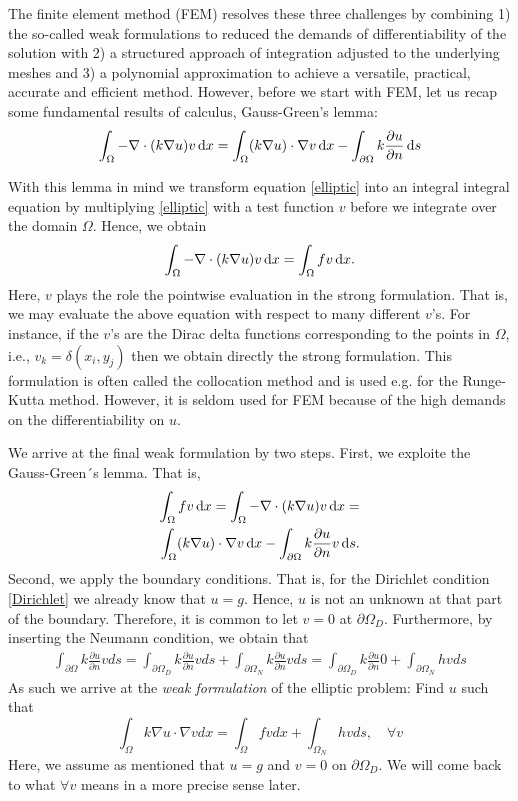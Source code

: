 The finite element method (FEM) resolves these three challenges by combining 1) the so-called weak formulations
to reduced the demands of differentiability of the solution with 2) a structured approach of integration
adjusted to the underlying meshes and 3) a polynomial approximation to achieve a versatile, practical, accurate
and efficient method. However, before we start with FEM, let us recap some fundamental results of calculus, 
Gauss-Green's lemma: 
\begin{equation}
\label{gaussgreen}
\int_\Omega 
-\nabla\cdot(k\nabla u) v \, \mathrm{d}x =  
\int_\Omega (k\nabla u) \cdot \nabla v \, \mathrm{d}x  - \int_{\partial \Omega} k\frac{\partial u} {\partial n} \, \mathrm{d}s 
\end{equation}

With this lemma in mind we transform equation \eqref{elliptic} into an integral integral equation by multiplying
\eqref{elliptic} with a test function $v$ before we integrate over the domain $\Omega$. Hence, 
we obtain  
\begin{equation}
\label{gaussgreen}
\int_\Omega -\nabla\cdot(k\nabla u) v \, \mathrm{d}x =  \int_\Omega f v \, \mathrm{d}x .  
\end{equation}
Here, $v$ plays the role the pointwise evaluation in the strong formulation. That is,
we may evaluate the above equation with respect to many different $v$'s. 
For instance, if the $v$'s are the Dirac delta functions corresponding to the points in $\Omega$, i.e.,  $v_k = \delta(x_i, y_j)$
then we obtain directly the strong formulation. This formulation is often called
the collocation method and is used e.g. for the Runge-Kutta method. However, it is 
seldom used for FEM because of the high demands on the differentiability on $u$. 

We arrive at the final weak formulation by two steps. First, we exploite the Gauss-Green´s lemma. That is,  
\begin{eqnarray*}
\label{gaussgreen}
\int_\Omega f v \, \mathrm{d}x =   \int_\Omega -\nabla\cdot(k\nabla u) v \, \mathrm{d}x =  \\ 
\int_\Omega (k\nabla u) \cdot \nabla v \, \mathrm{d}x  - \int_{\partial \Omega} k\frac{\partial u} {\partial n} v \, \mathrm{d}s  .  
\end{eqnarray*}
Second, we apply the boundary conditions. That is, for the Dirichlet
condition \eqref{Dirichlet} we already know that $u=g$. Hence, $u$ is not an unknown at that part of the boundary.  Therefore, it is common 
to let $v=0$ at $\partial \Omega_D$. Furthermore, by inserting the Neumann condition, we obtain that  
\begin{eqnarray}
\int_{\partial \Omega} k\frac{\partial u} {\partial n} v ds =   
\int_{\partial \Omega_D} k\frac{\partial u} {\partial n} v ds +   \int_{\partial \Omega_N} k\frac{\partial u} {\partial n} v ds =   
\int_{\partial \Omega_D} k\frac{\partial u} {\partial n} 0 +   \int_{\partial \Omega_N} h v ds   
\end{eqnarray}
As such we arrive at the \emph{weak formulation} of the elliptic problem: 
Find $u$ such that 
\[
\int_\Omega k \nabla u \cdot \nabla v dx = \int_\Omega f v dx + \int_{\Omega_N} h v ds, \quad \forall v  
\]
Here, we assume as mentioned that $u=g$ and $v=0$ on $\partial \Omega_D$. We will come back to what $\forall v$ means in a 
more precise sense later.  

